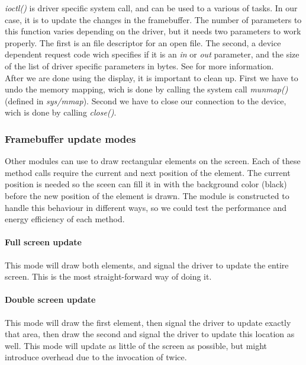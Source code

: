 \emph{ioctl()} is driver specific system call, and can be used to a various of tasks. In our case, it is to update the changes in the framebuffer. The number of parameters to this function varies depending on the driver, but it needs two parameters to work properly. The first is an file descriptor for an open file. The second, a device dependent request code wich specifies if it is an \emph{in} or \emph{out} parameter, and the size of the list of driver specific parameters in bytes. See \cite[ioctl]{linux_programmers_manual} for more information.   
\\

After we are done using the display, it is important to clean up. First we have to undo the memory mapping, wich is done by calling the system call \emph{munmap()} (defined in \emph{sys/mmap}). Second we have to close our connection to the device, wich is done by calling \emph{close()}.

\subsubsection{Framebuffer update modes}
\label{subsubsection:framebuffer-update-modes}
Other modules can use  to draw rectangular elements on the screen. Each of these method calls require the current and next position of the element. The current position is needed so the sceen can fill it in with the background color (black) before the new position of the element is drawn. The module is constructed to handle this behaviour in different ways, so we could test the performance and energy efficiency of each method.

\paragraph{Full screen update}
This mode will draw both elements, and signal the driver to update the entire screen. This is the most straight-forward way of doing it.

\paragraph{Double screen update}
This mode will draw the first element, then signal the driver to update exactly that area, then draw the second and signal the driver to update this location as well. This mode will update as little of the screen as possible, but might introduce overhead due to the invocation of  twice.

